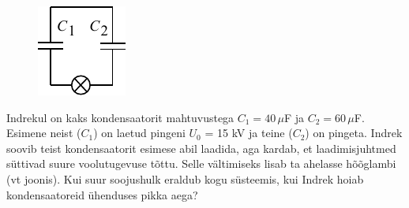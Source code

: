 
\begin{figure}
\vspace{-0.8cm}
  \begin{center}
    \includegraphics[width=1\linewidth]{2023-lahg-04-yl.pdf}
  \end{center}
  \vspace{-0.9cm}
\end{figure}

Indrekul on kaks kondensaatorit mahtuvustega $C_1=40\,\mu$F ja $C_2=60\,\mu$F. Esimene neist ($C_1$) on laetud pingeni $U_0$ = 15 kV ja teine ($C_2$) on pingeta. Indrek soovib teist kondensaatorit esimese abil laadida, aga kardab, et laadimisjuhtmed süttivad suure voolutugevuse tõttu. Selle vältimiseks lisab ta ahelasse hõõglambi (vt joonis). Kui suur soojushulk eraldub  kogu süsteemis, kui Indrek hoiab kondensaatoreid ühenduses pikka aega?






\hint

